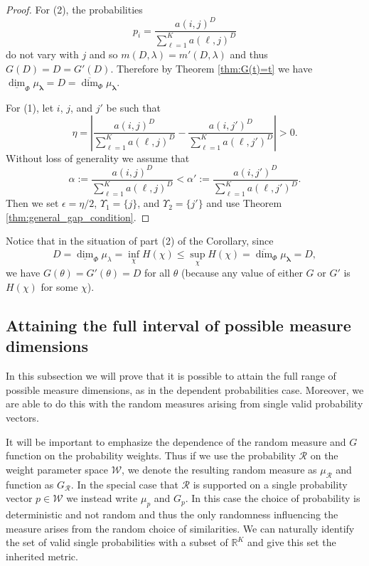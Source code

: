 \documentclass{amsart}
\theoremstyle{plain}
\numberwithin{equation}{section}
\newcommand{\cR}{{\mathcal R}}
\newcommand{\cW}{{\mathcal W}}
\newcommand{\blambda}{{\boldsymbol{\lambda}}}
\newcommand{\odim}{\overline{\dim}}
\newcommand{\udim}{\underline{\dim}}
\begin{document}
\begin{proof}
For (2), the probabilities
\begin{equation*}
    p_{i}=\frac{a(i,j)^{D}}{\sum_{\ell =1}^K a(\ell ,j)^{D}}
\end{equation*}
 do not vary with $j$ and so $m(D,\lambda) = m'(D,\lambda)$ and thus $G(D) = D = G'(D)$.
Therefore by Theorem \ref{thm:G(t)=t} we have $\udim_\Phi \mu_\blambda = D = \odim_\Phi \mu_\blambda$.

For (1), let $i$, $j$, and $j'$ be such that
\begin{equation*}
    \eta =\left| \frac{a(i,j)^{D}}{\sum_{\ell =1}^K a(\ell ,j)^{D}}-
         \frac{a(i,j')^{D}}{\sum_{\ell=1}^K a(\ell ,j')^{D}}\right| > 0.
\end{equation*}
Without loss of generality we assume that 
\begin{equation*}
    \alpha :=\frac{a(i,j)^{D}}{\sum_{\ell =1}^K a(\ell ,j)^{D}}<\alpha'
             :=\frac{a(i,j')^{D}}{\sum_{\ell =1}^K a(\ell ,j')^{D}}.
\end{equation*}
Then we set $\epsilon =\eta /2$, $\Upsilon_{1}=\{j\}$, and $\Upsilon_{2}=\{j'\}$ and use Theorem \ref{thm:general_gap_condition}.
\end{proof}

Notice that in the situation of part (2) of the Corollary, since 
\[
  D = \udim_\Phi \mu_\lambda = \inf_\chi H(\chi) \le \sup_\chi H(\chi) = \odim_\Phi \mu_\blambda = D,
\]
we have $G(\theta) = G'(\theta) = D$ for all $\theta$ (because any value of either $G$ or $G'$ is $H(\chi)$ for some $\chi$).


\subsection{Attaining the full interval of possible measure dimensions}

In this subsection we will prove that it is possible to attain the full
range of possible measure dimensions, as in the dependent probabilities
case. Moreover, we are able to do this with the random measures arising from
single valid probability vectors.

It will be important to emphasize the dependence of the random measure and $G$ function on the probability weights.
Thus if we use the probability $\cR$ on the weight parameter space $\cW$, we denote the resulting random measure as $\mu_\cR$
and function as $G_\cR$.
In the special case that $\cR$ is supported on a single probability vector $p \in \cW$ we instead write $\mu_p$ and $G_p$.
In this case the choice of probability is deterministic and not random and thus the only 
randomness influencing the measure arises from the random choice of similarities.
We can naturally identify the set of valid single probabilities with a subset of 
$\mathbb{R}^{K}$ and give this set the inherited metric.
\end{document}
